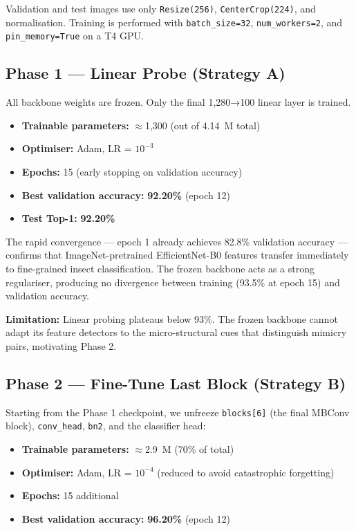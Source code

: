 \documentclass[journal, twocolumn]{IEEEtran}
\begin{document}
Validation and test images use only \texttt{Resize(256)}, \texttt{CenterCrop(224)}, and normalisation. Training is performed with \texttt{batch\_size=32}, \texttt{num\_workers=2}, and \texttt{pin\_memory=True} on a T4 GPU.

\subsection{Phase 1 — Linear Probe (Strategy A)}

All backbone weights are frozen. Only the final 1,280→100 linear layer is trained.

\begin{itemize}
    \item \textbf{Trainable parameters:} $\approx$1,300 (out of 4.14~M total)
    \item \textbf{Optimiser:} Adam, LR = $10^{-3}$
    \item \textbf{Epochs:} 15 (early stopping on validation accuracy)
    \item \textbf{Best validation accuracy:} \textbf{92.20\%} (epoch 12)
    \item \textbf{Test Top-1:} \textbf{92.20\%}
\end{itemize}

The rapid convergence — epoch 1 already achieves 82.8\% validation accuracy — confirms that ImageNet-pretrained EfficientNet-B0 features transfer immediately to fine-grained insect classification. The frozen backbone acts as a strong regulariser, producing no divergence between training (93.5\% at epoch 15) and validation accuracy.

\textbf{Limitation:} Linear probing plateaus below 93\%. The frozen backbone cannot adapt its feature detectors to the micro-structural cues that distinguish mimicry pairs, motivating Phase 2.

\subsection{Phase 2 — Fine-Tune Last Block (Strategy B)}

Starting from the Phase 1 checkpoint, we unfreeze \texttt{blocks[6]} (the final MBConv block), \texttt{conv\_head}, \texttt{bn2}, and the classifier head:

\begin{itemize}
    \item \textbf{Trainable parameters:} $\approx$2.9~M (70\% of total)
    \item \textbf{Optimiser:} Adam, LR = $10^{-4}$ (reduced to avoid catastrophic forgetting)
    \item \textbf{Epochs:} 15 additional
    \item \textbf{Best validation accuracy:} \textbf{96.20\%} (epoch 12)
\end{itemize}
\end{document}
